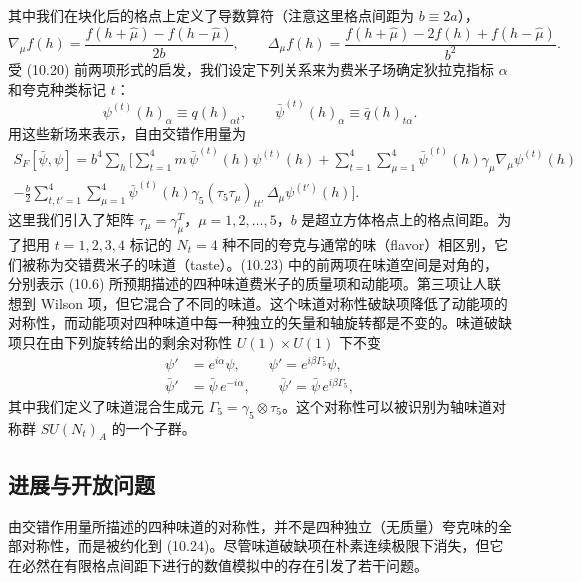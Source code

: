 其中我们在块化后的格点上定义了导数算符（注意这里格点间距为 $b \equiv 2a$），
\begin{equation}
  \nabla_\mu f(h) = \frac{f(h+\hat\mu) - f(h-\hat\mu)}{2b} , \qquad
  \Delta_\mu f(h) = \frac{f(h+\hat\mu) - 2f(h) + f(h-\hat\mu)}{b^2} .
\end{equation}
受 (10.20) 前两项形式的启发，我们设定下列关系来为费米子场确定狄拉克指标 $\alpha$ 和夸克种类标记 $t$：
\begin{equation}
  \psi^{(t)}(h)_\alpha \equiv q(h)_{\alpha t} , \qquad
  \bar\psi^{(t)}(h)_\alpha \equiv \bar q(h)_{t\alpha} .
\end{equation}
用这些新场来表示，自由交错作用量为
\begin{multline}
  S_F[\bar\psi, \psi] = b^4 \sum_h \Bigg[
  \sum_{t=1}^{4} m\,\bar\psi^{(t)}(h)\psi^{(t)}(h)
  + \sum_{t=1}^{4}\sum_{\mu=1}^{4}
  \bar\psi^{(t)}(h)\gamma_\mu\nabla_\mu\psi^{(t)}(h) \\
  - \frac{b}{2} \sum_{t,t'=1}^{4}\sum_{\mu=1}^{4}
  \bar\psi^{(t)}(h)\gamma_5(\tau_5\tau_\mu)_{tt'}\,
  \Delta_\mu\psi^{(t')}(h) \Bigg] .
\end{multline}
这里我们引入了矩阵 $\tau_\mu = \gamma_\mu^{T}$，$\mu = 1, 2, \ldots, 5$，$b$ 是超立方体格点上的格点间距。为了把用 $t = 1, 2, 3, 4$ 标记的 $N_t = 4$ 种不同的夸克与通常的味（flavor）相区别，它们被称为交错费米子的味道（taste）。(10.23) 中的前两项在味道空间是对角的，分别表示 (10.6) 所预期描述的四种味道费米子的质量项和动能项。第三项让人联想到 Wilson 项，但它混合了不同的味道。这个味道对称性破缺项降低了动能项的对称性，而动能项对四种味道中每一种独立的矢量和轴旋转都是不变的。味道破缺项只在由下列旋转给出的剩余对称性 $U(1) \times U(1)$ 下不变
\begin{equation}
  \begin{split}
    \psi' &= e^{i\alpha}\psi , \qquad \psi' = e^{i\beta\Gamma_5}\psi , \\
    \bar\psi' &= \bar\psi\, e^{-i\alpha} , \qquad
    \bar\psi' = \bar\psi\, e^{i\beta\Gamma_5} ,
  \end{split}
\end{equation}
其中我们定义了味道混合生成元 $\Gamma_5 = \gamma_5 \otimes \tau_5$。这个对称性可以被识别为轴味道对称群 $SU(N_t)_A$ 的一个子群。

\subsection{进展与开放问题}

由交错作用量所描述的四种味道的对称性，并不是四种独立（无质量）夸克味的全部对称性，而是被约化到 (10.24)。尽管味道破缺项在朴素连续极限下消失，但它在必然在有限格点间距下进行的数值模拟中的存在引发了若干问题。

